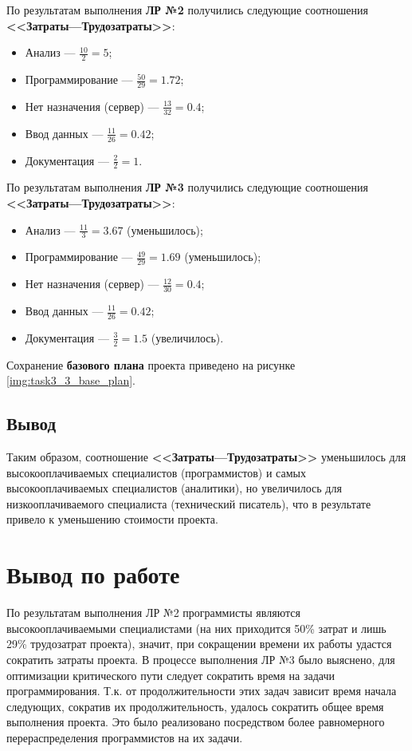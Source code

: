 \newpage
По результатам выполнения \textbf{ЛР №2} получились следующие соотношения \textbf{<<Затраты---Трудозатраты>>}:
\begin{itemize}[label = ---]
	\item Анализ --- $\frac{10}{2}=5$;
	\item Программирование --- $\frac{50}{29}=1.72$;
	\item Нет назначения (сервер) --- $\frac{13}{32}=0.4$;
	\item Ввод данных --- $\frac{11}{26}=0.42$;
	\item Документация --- $\frac{2}{2}=1$.
\end{itemize}

По результатам выполнения \textbf{ЛР №3} получились следующие соотношения \textbf{<<Затраты---Трудозатраты>>}:
\begin{itemize}[label = ---]
	\item Анализ --- $\frac{11}{3}=3.67$ (уменьшилось);
	\item Программирование --- $\frac{49}{29}=1.69$ (уменьшилось);
	\item Нет назначения (сервер) --- $\frac{12}{30}=0.4$;
	\item Ввод данных --- $\frac{11}{26}=0.42$;
	\item Документация --- $\frac{3}{2}=1.5$ (увеличилось).
\end{itemize}

Сохранение \textbf{базового плана} проекта приведено на рисунке \ref{img:task3_3_base_plan}. 

\subsection*{Вывод}
Таким образом, соотношение \textbf{<<Затраты---Трудозатраты>>} уменьшилось для высокооплачиваемых специалистов (программистов) и самых высокооплачиваемых специалистов (аналитики), но увеличилось для низкооплачиваемого специалиста (технический писатель), что в результате привело к уменьшению стоимости проекта.

\section{Вывод по работе}

По результатам выполнения ЛР №2 программисты являются высокооплачиваемыми специалистами (на них приходится 50\% затрат и лишь 29\% трудозатрат проекта), значит, при сокращении времени их работы удастся сократить затраты проекта. В процессе выполнения ЛР №3 было выяснено, для оптимизации критического пути следует сократить время на задачи программирования. Т.к. от продолжительности этих задач зависит время начала следующих, сократив их продолжительность, удалось сократить общее время выполнения проекта. Это было реализовано посредством более равномерного перераспределения программистов на их задачи.

